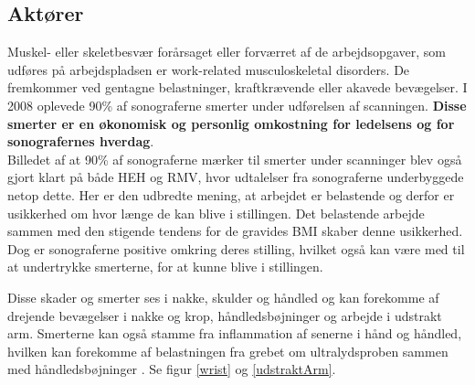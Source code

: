 \subsection{Aktører} \label{aktoerer_organisation}
Muskel- eller skeletbesvær forårsaget eller forværret af de arbejdsopgaver, som udføres på arbejdspladsen er work-related musculoskeletal disorders. De fremkommer ved gentagne belastninger, kraftkrævende eller akavede bevægelser. I 2008 oplevede 90\% af sonograferne smerter under udførelsen af scanningen. \textbf{Disse smerter er en økonomisk og personlig omkostning for ledelsens og for sonografernes hverdag}. \cite{31}\cite{30}\\
Billedet af at 90\% af sonograferne mærker til smerter under scanninger blev også gjort klart på både HEH og RMV, hvor udtalelser fra sonograferne underbyggede netop dette. Her er den udbredte mening, at arbejdet er belastende og derfor er usikkerhed om hvor længe de kan blive i stillingen. Det belastende arbejde sammen med den stigende tendens for de gravides BMI skaber denne usikkerhed. \cite{kvinderovervaegt} \\
Dog er sonograferne positive omkring deres stilling, hvilket også kan være med til at undertrykke smerterne, for at kunne blive i stillingen.

Disse skader og smerter ses i nakke, skulder og håndled og kan forekomme af drejende bevægelser i nakke og krop, håndledsbøjninger og arbejde i udstrakt arm. Smerterne kan også stamme fra inflammation af senerne i hånd og håndled, hvilken kan forekomme af belastningen fra grebet om ultralydsproben sammen med håndledsbøjninger \cite{31}. Se figur \ref{wrist} og \ref{udstraktArm}.

